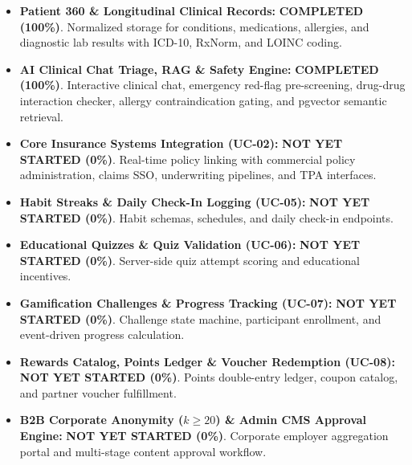 \documentclass[11pt,a4paper]{article}
\begin{document}
\begin{itemize}[leftmargin=1.5em]
    \item \textbf{Patient 360 \& Longitudinal Clinical Records:} \textcolor{statuscompleted}{\textbf{COMPLETED (100\%)}}. Normalized storage for conditions, medications, allergies, and diagnostic lab results with ICD-10, RxNorm, and LOINC coding.
    \item \textbf{AI Clinical Chat Triage, RAG \& Safety Engine:} \textcolor{statuscompleted}{\textbf{COMPLETED (100\%)}}. Interactive clinical chat, emergency red-flag pre-screening, drug-drug interaction checker, allergy contraindication gating, and pgvector semantic retrieval.
    \item \textbf{Core Insurance Systems Integration (UC-02):} \textcolor{statusnotstarted}{\textbf{NOT YET STARTED (0\%)}}. Real-time policy linking with commercial policy administration, claims SSO, underwriting pipelines, and TPA interfaces.
    \item \textbf{Habit Streaks \& Daily Check-In Logging (UC-05):} \textcolor{statusnotstarted}{\textbf{NOT YET STARTED (0\%)}}. Habit schemas, schedules, and daily check-in endpoints.
    \item \textbf{Educational Quizzes \& Quiz Validation (UC-06):} \textcolor{statusnotstarted}{\textbf{NOT YET STARTED (0\%)}}. Server-side quiz attempt scoring and educational incentives.
    \item \textbf{Gamification Challenges \& Progress Tracking (UC-07):} \textcolor{statusnotstarted}{\textbf{NOT YET STARTED (0\%)}}. Challenge state machine, participant enrollment, and event-driven progress calculation.
    \item \textbf{Rewards Catalog, Points Ledger \& Voucher Redemption (UC-08):} \textcolor{statusnotstarted}{\textbf{NOT YET STARTED (0\%)}}. Points double-entry ledger, coupon catalog, and partner voucher fulfillment.
    \item \textbf{B2B Corporate Anonymity ($k \ge 20$) \& Admin CMS Approval Engine:} \textcolor{statusnotstarted}{\textbf{NOT YET STARTED (0\%)}}. Corporate employer aggregation portal and multi-stage content approval workflow.
\end{itemize}
\end{document}

